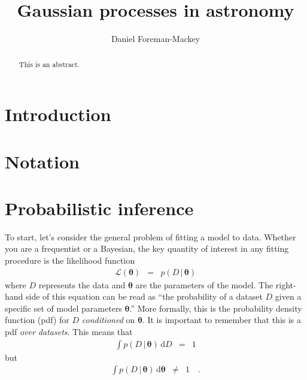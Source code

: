 \documentclass[modern, letterpaper]{aastex61}
\newcommand{\dd}{\ensuremath{\,\mathrm{d}}}
\newcommand{\bvec}[1]{{\ensuremath{\boldsymbol{#1}}}}
\begin{document}
\sloppy\sloppypar\raggedbottom\frenchspacing

\title{Gaussian processes in astronomy}


\author[0000-0002-9328-5652]{Daniel Foreman-Mackey}

\begin{abstract}\noindent

    This is an abstract.

\end{abstract}

\keywords{%
}

\section{Introduction}

\section{Notation}

\section{Probabilistic inference}

To start, let's consider the general problem of fitting a model to data.
Whether you are a frequentist or a Bayesian, the key quantity of interest in
any fitting procedure is the likelihood function
\begin{eqnarray}
\mathcal{L}(\bvec{\theta}) &=& p(D\,|\,\bvec{\theta})
\end{eqnarray}
where $D$ represents the data and $\bvec{\theta}$ are the parameters of the
model.
The right-hand side of this equation can be read as ``the probability of a
dataset $D$ given a specific set of model parameters $\bvec{\theta}$.''
More formally, this is the probability density function (pdf) for $D$
\emph{conditioned} on $\bvec{\theta}$.
It is important to remember that this is a pdf \emph{over datasets}.
This means that
\begin{eqnarray}
\int p(D\,|\,\bvec{\theta}) \dd D &=& 1
\end{eqnarray}
but
\begin{eqnarray}
    \int p(D\,|\,\bvec{\theta}) \dd \bvec{\theta} &\ne& 1 \quad.
\end{eqnarray}
\end{document}
